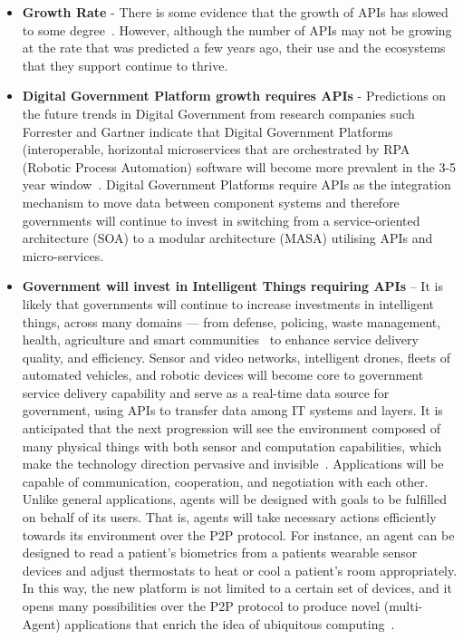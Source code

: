 \begin{itemize}
	\item \textbf{Growth Rate} - There is some evidence that the growth of APIs has slowed
	to some degree~\citep{api_economy}. However, although the number of APIs may not be
	growing at the rate that was predicted a few years ago, their use and the
	ecosystems that they support continue to thrive.
	
	\item \textbf{Digital Government Platform growth requires APIs} - Predictions on the
	future trends in Digital Government from research companies such Forrester
	and Gartner indicate that Digital Government Platforms (interoperable,
	horizontal microservices that are orchestrated by RPA (Robotic Process
	Automation) software will become more prevalent in the 3-5 year window~\citep{gov_transformation}.
	Digital Government Platforms require APIs as the integration mechanism to move
	data between component systems and therefore governments will continue to
	invest in switching from a service-oriented architecture (SOA) to a modular
	architecture (MASA) utilising APIs and micro-services.
	
	\item \textbf{Government will invest in Intelligent Things requiring APIs} – It is
	likely that governments will continue to increase investments in intelligent
	things, across many domains — from defense,	policing, waste management, health, agriculture and smart communities~\citep{trends_2017} to enhance service delivery quality,
	and	efficiency. Sensor and video networks, intelligent drones, fleets of automated
	vehicles, and robotic devices will become core to government service delivery
	capability and serve as a real-time data source for government, using APIs to
	transfer data among IT systems and layers. It is anticipated that the next
	progression will see the environment composed of many physical things with both
	sensor and computation capabilities, which make the technology direction
	pervasive and invisible~\citep{dzone_iot}. Applications will be capable of
	communication, cooperation, and negotiation with each other. Unlike general
	applications, agents will be designed with goals to be fulfilled on behalf
	of its users. That is, agents will take necessary actions efficiently towards
	its environment over the P2P protocol. For instance, an agent can be designed
	to read a patient’s biometrics from a patients wearable sensor devices and
	adjust thermostats to heat or cool a patient’s room appropriately. In this way,
	the new platform is not limited to a certain set of devices, and it opens many possibilities over the P2P protocol to produce novel (multi-Agent) applications
	that enrich the idea of ubiquitous computing~\citep{ubiquitous_computing}.
	

\end{itemize}
